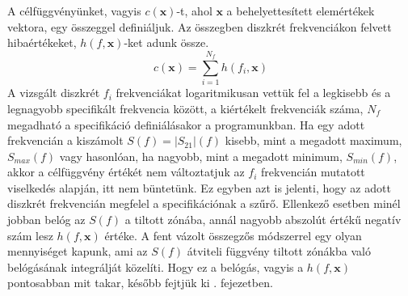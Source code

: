     A célfüggvényünket, vagyis $c(\mathbf{x})$-t, ahol $\mathbf{x}$ a behelyettesített elemértékek vektora, egy összeggel definiáljuk. Az összegben diszkrét frekvenciákon felvett hibaértékeket, $h(f,\mathbf{x})$-ket adunk össze.
    \begin{equation}
        c(\mathbf{x}) = \sum_{i=1}^{N_f} h(f_i,\mathbf{x})
    \end{equation}
    A vizsgált diszkrét $f_i$ frekvenciákat logaritmikusan vettük fel a legkisebb és a legnagyobb specifikált frekvencia között, a kiértékelt frekvenciák száma, $N_f$ megadható a specifikáció definiálásakor a programunkban. Ha egy adott frekvencián a kiszámolt $S(f)=|S_{21}|(f)$ kisebb, mint a megadott maximum, $S_{max}(f)$ vagy hasonlóan, ha nagyobb, mint a megadott minimum, $S_{min}(f)$, akkor a célfüggvény értékét nem változtatjuk az $f_i$ frekvencián mutatott viselkedés alapján, itt nem büntetünk. Ez egyben azt is jelenti, hogy az adott diszkrét frekvencián megfelel a specifikációnak a szűrő. Ellenkező esetben minél jobban belóg az $S(f)$ a tiltott zónába, annál nagyobb abszolút értékű negatív szám lesz $h(f,\mathbf{x})$ értéke. A fent vázolt összegzős módszerrel egy olyan mennyiséget kapunk, ami az $S(f)$ átviteli függvény tiltott zónákba való belógásának integrálját közelíti. Hogy ez a belógás, vagyis a $h(f,\mathbf{x})$ pontosabban mit takar, később fejtjük ki . fejezetben.
